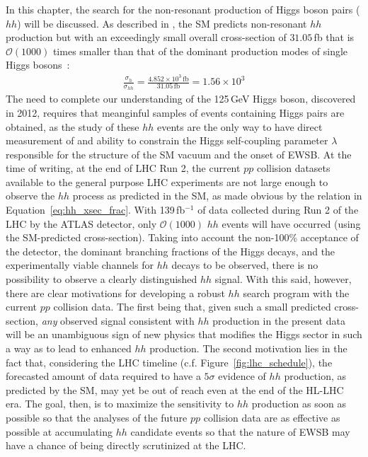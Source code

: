 In this chapter, the search for the non-resonant production of Higgs boson pairs ($hh$) will be discussed.
As described in {\color{red}{Section XXX}}, the SM predicts non-resonant $hh$ production but with
an exceedingly small overall cross-section of $31.05$\,fb that is $\mathcal{O}(1000)$ times smaller
than that of the dominant production modes of single Higgs bosons~\cite{deFlorian:2016spz,Dawson:1998py,Borowka:2016ehy,Baglio:2018lrj,deFlorian:2013jea,Shao:2013bz,deFlorian:2015moa,Grazzini:2018bsd}:
\begin{align}
    \frac{\sigma_h}{\sigma_{hh}} = \frac{ 4.852 \times 10^3\,\mathrm{fb}}{31.05\,\mathrm{fb}} = 1.56 \times 10^3
    \label{eq:hh_xsec_frac}
\end{align}
The need to complete our understanding of the 125\,GeV Higgs boson, discovered in 2012, requires
that meanginful samples of events containing Higgs pairs are obtained, as the study of these $hh$
events are the only way to have direct measurement of and ability to constrain the Higgs self-coupling parameter $\lambda$
responsible for the structure of the SM vacuum and the onset of EWSB.
At the time of writing, at the end of LHC Run 2, the current $pp$ collision datasets available to the
general purpose LHC experiments are not large enough to observe the $hh$ process as predicted in the SM,
as made obvious by the relation in  Equation~\ref{eq:hh_xsec_frac}.
With 139\,fb$^{-1}$ of data collected during Run 2 of the LHC by the ATLAS detector,
only $\mathcal{O}(1000)$ $hh$ events will have occurred (using the SM-predicted cross-section).
Taking into account the non-100\% acceptance of the detector, the dominant branching fractions
of the Higgs decays, and the experimentally viable channels for $hh$ decays to be observed,
there is no possibility to observe a clearly distinguished $hh$ signal.
With this said, however, there are clear motivations for developing a robust $hh$ search program with the
current $pp$ collision data.
The first being that, given such a small predicted cross-section, \textit{any} observed signal consistent
with $hh$ production in the present data will be an unambiguous sign of new physics
that modifies the Higgs sector in such a way as to lead to enhanced $hh$ production.
The second motivation lies in the fact that, considering the LHC timeline (c.f. Figure~\ref{fig:lhc_schedule}), the
forecasted amount of data required to have a $5\sigma$ evidence of $hh$ production, as predicted by the SM,
may yet be out of reach even at the end of the HL-LHC era.
The goal, then, is to maximize the sensitivity to $hh$ production as soon as possible so that
the analyses of the future $pp$ collision data are as effective as possible at accumulating $hh$
candidate events so that the nature of EWSB may have a chance of being directly scrutinized at the LHC.

